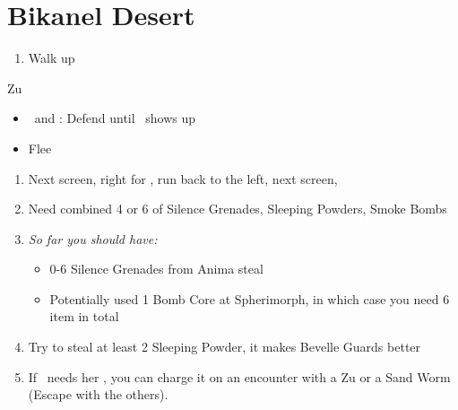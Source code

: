 \chapter{Bikanel Desert}

\begin{enumerate}
    \item Walk up
\end{enumerate}
\begin{battle}{Zu}
    \begin{itemize}
        \tidusf Attack
        \enemyf Attack
        \tidusf Equip Sonic Steel
        \item \tidus\ and \auron: Defend until \lulu\ shows up
        \item Flee
    \end{itemize}
\end{battle}
\begin{enumerate}[resume]
    \item Next screen, right for \kimahri, run back to the left, next screen, \save
    \item Need combined 4 or 6 of Silence Grenades, Sleeping Powders, Smoke Bombs
    \item \textit{So far you should have:}
    \begin{itemize}
        \item 0-6 Silence Grenades from Anima steal
        \item Potentially used 1 Bomb Core at Spherimorph, in which case you need 6 item in total
    \end{itemize}
    \item Try to steal at least 2 Sleeping Powder, it makes Bevelle Guards better
    \item If \rikku\ needs her \od, you can charge it on an encounter with a Zu or a Sand Worm (Escape with the others).
\end{enumerate}
